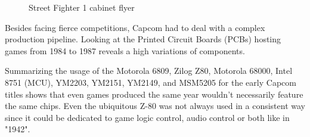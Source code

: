 \begin{figure}[H]
\caption*{Street Fighter 1 cabinet flyer}
\end{figure}


Besides facing fierce competitions, Capcom had to deal with a complex production pipeline. Looking at the Printed Circuit Boards (PCBs) hosting games from 1984 to 1987 reveals a high variations of components.

Summarizing the usage of the Motorola 6809, Zilog Z80, Motorola 68000, Intel 8751 (MCU), YM2203, YM2151, YM2149, and MSM5205 for the early Capcom titles shows that even games produced the same year wouldn't necessarily feature the same chips. Even the ubiquitous Z-80 was not always used in a consistent way since it could be dedicated to game logic control, audio control or both like in "1942".



